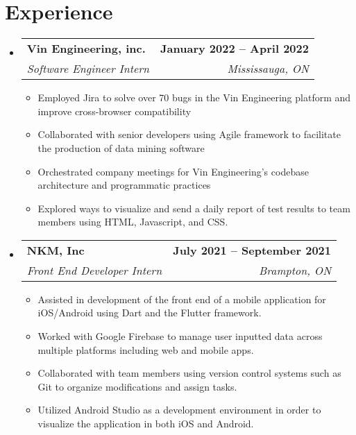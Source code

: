 \documentclass[letterpaper,11pt]{article}
\makeatletter
\newcommand{\resumeItem}[1]{
  \item\small{
    {#1 \vspace{-2pt}}
  }
}
\newcommand{\resumeSubheading}[4]{
  \vspace{-2pt}\item
    \begin{tabular*}{1.0\textwidth}[t]{l@{\extracolsep{\fill}}r}
      \textbf{#1} & \textbf{\small #2} \\
      \textit{\small#3} & \textit{\small #4} \\
    \end{tabular*}\vspace{-7pt}
}
\newcommand{\resumeSubHeadingListStart}{\begin{itemize}[leftmargin=0.0in, label={}]}
\newcommand{\resumeSubHeadingListEnd}{\end{itemize}}
\newcommand{\resumeItemListStart}{\begin{itemize}}
\newcommand{\resumeItemListEnd}{\end{itemize}\vspace{-5pt}}
\makeatother
\begin{document}
\section{Experience}
  \resumeSubHeadingListStart

    \resumeSubheading
      {Vin Engineering, inc.}{January 2022 -- April 2022}
      {Software Engineer Intern}{Mississauga, ON}
      \resumeItemListStart
        \resumeItem{Employed Jira to solve over 70 bugs in the Vin Engineering platform and improve cross-browser compatibility}
        \resumeItem{Collaborated with senior developers using Agile framework to facilitate the production of data mining software}
        \resumeItem{Orchestrated company meetings for Vin Engineering’s codebase architecture and programmatic practices}
        \resumeItem{Explored ways to visualize and send a daily report of test results to team members  using HTML, Javascript, and CSS.}
      \resumeItemListEnd

    \resumeSubheading
      {NKM, Inc}{July 2021 -- September 2021}
      {Front End Developer Intern}{Brampton, ON}
      \resumeItemListStart
        \resumeItem{Assisted in development of the front end of a mobile application for iOS/Android using Dart and the Flutter framework.}
        \resumeItem{Worked with Google Firebase to manage user inputted data across multiple platforms including web and mobile apps.}
        \resumeItem{Collaborated with team members using version control systems such as Git to organize modifications and assign tasks.}
        \resumeItem{Utilized Android Studio as a development environment in order to visualize the application in both iOS and Android.}
    \resumeItemListEnd
    
  \resumeSubHeadingListEnd
\vspace{-16pt}

\end{document}
